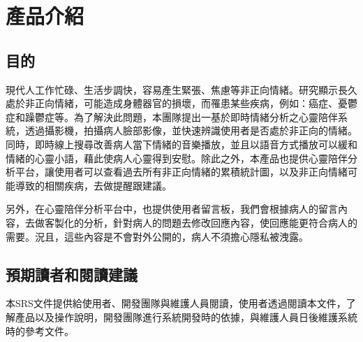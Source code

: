 \documentclass[12pt]{scrreprt}
\begin{document}
\chapter{產品介紹}

\section{目的}

現代人工作忙碌、生活步調快，容易產生緊張、焦慮等非正向情緒。研究顯示長久處於非正向情緒，可能造成身體器官的損壞，而罹患某些疾病，例如：癌症、憂鬱症和躁鬱症等。為了解決此問題，本團隊提出一基於即時情緒分析之心靈陪伴系統，透過攝影機，拍攝病人臉部影像，並快速辨識使用者是否處於非正向的情緒。同時，即時線上搜尋改善病人當下情緒的音樂播放，並且以語音方式播放可以緩和情緒的心靈小語，藉此使病人心靈得到安慰。除此之外，本產品也提供心靈陪伴分析平台，讓使用者可以查看過去所有非正向情緒的累積統計圖，以及非正向情緒可能導致的相關疾病，去做提醒跟建議。

另外，在心靈陪伴分析平台中，也提供使用者留言板，我們會根據病人的留言內容，去做客製化的分析，針對病人的問題去修改回應內容，使回應能更符合病人的需要。況且，這些內容是不會對外公開的，病人不須擔心隱私被洩露。


\section{預期讀者和閱讀建議}

本SRS文件提供給使用者、開發團隊與維護人員閱讀，使用者透過閱讀本文件，了解產品以及操作說明，開發團隊進行系統開發時的依據，與維護人員日後維護系統時的參考文件。
\end{document}
